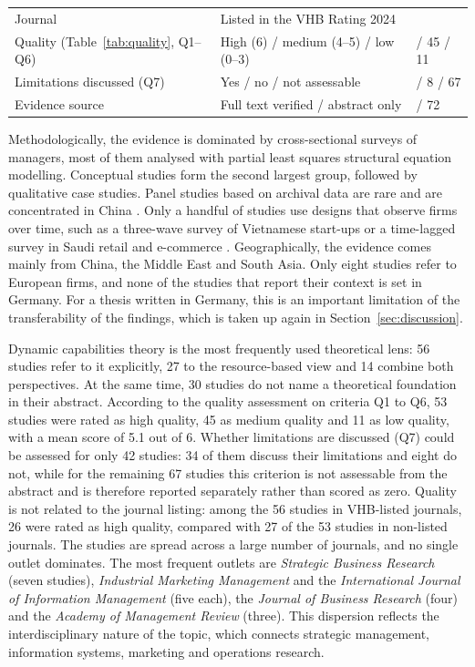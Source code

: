 \begin{table}[H]
\begin{tabularx}{\textwidth}{>{\raggedright\arraybackslash}p{3.2cm}>{\raggedright\arraybackslash}X>{\raggedleft\arraybackslash}p{1.2cm}}
    \addlinespace
    Journal & Listed in the VHB Rating 2024 & 56 \\
    \addlinespace
    Quality (Table~\ref{tab:quality}, Q1--Q6) & High (6) / medium (4--5) / low (0--3) & 53 / 45 / 11 \\
    \addlinespace
    Limitations discussed (Q7) & Yes / no / not assessable & 34 / 8 / 67 \\
    \addlinespace
    Evidence source & Full text verified / abstract only & 37 / 72 \\
    \bottomrule
  \end{tabularx}
\end{table}

Methodologically, the evidence is dominated by cross-sectional surveys of managers, most of them analysed with partial least squares structural equation modelling. Conceptual studies form the second largest group, followed by qualitative case studies. Panel studies based on archival data are rare and are concentrated in China . Only a handful of studies use designs that observe firms over time, such as a three-wave survey of Vietnamese start-ups  or a time-lagged survey in Saudi retail and e-commerce . Geographically, the evidence comes mainly from China, the Middle East and South Asia. Only eight studies refer to European firms, and none of the studies that report their context is set in Germany. For a thesis written in Germany, this is an important limitation of the transferability of the findings, which is taken up again in Section~\ref{sec:discussion}.

Dynamic capabilities theory is the most frequently used theoretical lens: 56 studies refer to it explicitly, 27 to the resource-based view and 14 combine both perspectives. At the same time, 30 studies do not name a theoretical foundation in their abstract. According to the quality assessment on criteria Q1 to Q6, 53 studies were rated as high quality, 45 as medium quality and 11 as low quality, with a mean score of 5.1 out of 6. Whether limitations are discussed (Q7) could be assessed for only 42 studies: 34 of them discuss their limitations and eight do not, while for the remaining 67 studies this criterion is not assessable from the abstract and is therefore reported separately rather than scored as zero. Quality is not related to the journal listing: among the 56 studies in VHB-listed journals, 26 were rated as high quality, compared with 27 of the 53 studies in non-listed journals. The studies are spread across a large number of journals, and no single outlet dominates. The most frequent outlets are \emph{Strategic Business Research} (seven studies), \emph{Industrial Marketing Management} and the \emph{International Journal of Information Management} (five each), the \emph{Journal of Business Research} (four) and the \emph{Academy of Management Review} (three). This dispersion reflects the interdisciplinary nature of the topic, which connects strategic management, information systems, marketing and operations research.

